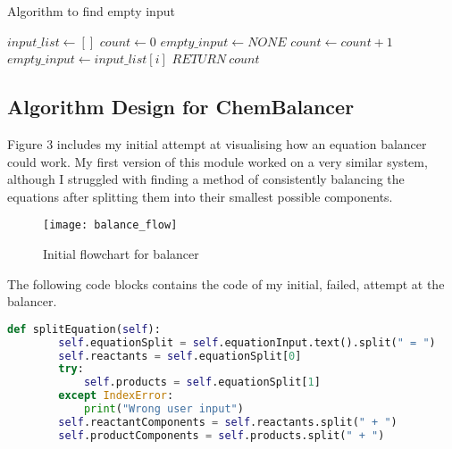 \documentclass[a4paper,12pt]{article}
\begin{document}
\begin{algorithm}
\caption{Algorithm to find empty input}\label{alg:cap}
\begin{algorithmic}
\State $ input\_list \gets []$
\State $ count \gets 0$
\State $ empty\_input \gets NONE$
	\State $ count \gets count\ $+$\ 1$
	\State $ empty\_input \gets input\_list[i]$
\EndIf
\EndFor
{}
	\State $ RETURN\ count$
\EndIf
\end{algorithmic}
\end{algorithm}

\newpage

\subsection{Algorithm Design for ChemBalancer}

Figure 3 includes my initial attempt at visualising how an equation balancer could work. My first version of this module worked on a very similar system, although I struggled with finding a method of consistently balancing the equations after splitting them into their smallest possible components. 

\begin{figure} [h]
	\centering
	\texttt{[image: balance\_flow]}
	\caption{Initial flowchart for balancer}
	\label{fig:balance_flow}
\end{figure}

The following code blocks contains the code of my initial, failed, attempt at the balancer.

\begin{lstlisting}[language=Python, caption=Method for splitting equation into components]
def splitEquation(self):
        self.equationSplit = self.equationInput.text().split(" = ")
        self.reactants = self.equationSplit[0]
        try:
            self.products = self.equationSplit[1]
        except IndexError:
            print("Wrong user input")
        self.reactantComponents = self.reactants.split(" + ")
        self.productComponents = self.products.split(" + ")
\end{lstlisting}
\end{document}
